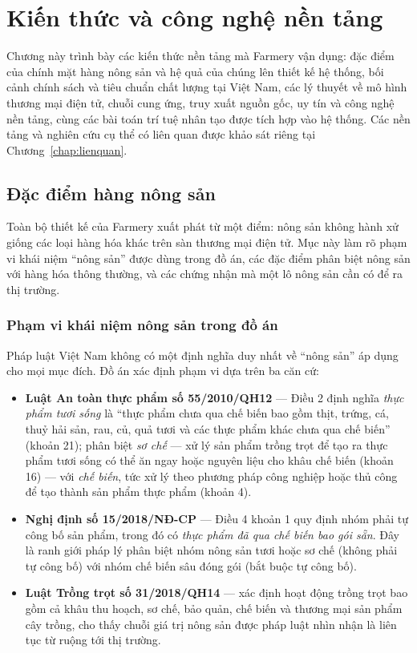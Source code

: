 \chapter{Kiến thức và công nghệ nền tảng}
\label{chap:coso}

Chương này trình bày các kiến thức nền tảng mà Farmery vận dụng: đặc điểm của chính mặt hàng nông sản và hệ quả của chúng lên thiết kế hệ thống, bối cảnh chính sách và tiêu chuẩn chất lượng tại Việt Nam, các lý thuyết về mô hình thương mại điện tử, chuỗi cung ứng, truy xuất nguồn gốc, uy tín và công nghệ nền tảng, cùng các bài toán trí tuệ nhân tạo được tích hợp vào hệ thống. Các nền tảng và nghiên cứu cụ thể có liên quan được khảo sát riêng tại Chương~\ref{chap:lienquan}.

\section{Đặc điểm hàng nông sản}
\label{sec:dacdiemnongsan}

Toàn bộ thiết kế của Farmery xuất phát từ một điểm: nông sản không hành xử giống các loại hàng hóa khác trên sàn thương mại điện tử. Mục này làm rõ phạm vi khái niệm ``nông sản'' được dùng trong đồ án, các đặc điểm phân biệt nông sản với hàng hóa thông thường, và các chứng nhận mà một lô nông sản cần có để ra thị trường.

\subsection{Phạm vi khái niệm nông sản trong đồ án}
\label{subsec:dinhnghianongsan}

Pháp luật Việt Nam không có một định nghĩa duy nhất về ``nông sản'' áp dụng cho mọi mục đích. Đồ án xác định phạm vi dựa trên ba căn cứ:

\begin{itemize}
    \item \textbf{Luật An toàn thực phẩm số 55/2010/QH12} \parencite{luat_attp_2010} --- Điều 2 định nghĩa \emph{thực phẩm tươi sống} là ``thực phẩm chưa qua chế biến bao gồm thịt, trứng, cá, thuỷ hải sản, rau, củ, quả tươi và các thực phẩm khác chưa qua chế biến'' (khoản 21); phân biệt \emph{sơ chế} --- xử lý sản phẩm trồng trọt để tạo ra thực phẩm tươi sống có thể ăn ngay hoặc nguyên liệu cho khâu chế biến (khoản 16) --- với \emph{chế biến}, tức xử lý theo phương pháp công nghiệp hoặc thủ công để tạo thành sản phẩm thực phẩm (khoản 4).
    \item \textbf{Nghị định số 15/2018/NĐ-CP} \parencite{nd15_2018} --- Điều 4 khoản 1 quy định nhóm phải tự công bố sản phẩm, trong đó có \emph{thực phẩm đã qua chế biến bao gói sẵn}. Đây là ranh giới pháp lý phân biệt nhóm nông sản tươi hoặc sơ chế (không phải tự công bố) với nhóm chế biến sâu đóng gói (bắt buộc tự công bố).
    \item \textbf{Luật Trồng trọt số 31/2018/QH14} \parencite{luat_trongtrot_2018} --- xác định hoạt động trồng trọt bao gồm cả khâu thu hoạch, sơ chế, bảo quản, chế biến và thương mại sản phẩm cây trồng, cho thấy chuỗi giá trị nông sản được pháp luật nhìn nhận là liên tục từ ruộng tới thị trường.
\end{itemize}

